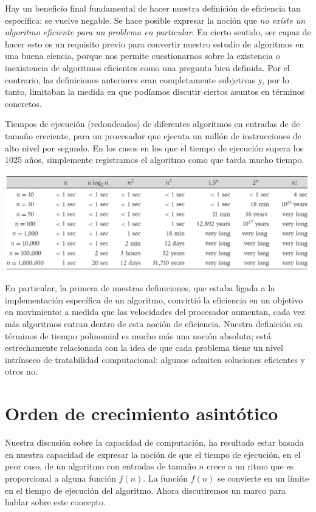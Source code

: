 \documentclass[a4paper, 12pt]{book}
\begin{document}
Hay un beneficio final fundamental de hacer nuestra definición de eficiencia tan específica: se vuelve negable. Se hace posible expresar la noción que \textit{no existe un algoritmo eficiente para un problema en particular}. En cierto sentido, ser capaz de hacer esto es un requisito previo para convertir nuestro estudio de algoritmos en una buena ciencia, porque nos permite cuestionarnos sobre la existencia o inexistencia de algoritmos eficientes como una pregunta bien definida. Por el contrario, las definiciones anteriores eran completamente subjetivas y, por lo tanto, limitaban la medida en que podíamos discutir ciertos asuntos en términos concretos.

\begin{table}[h]
    \centering
    \caption{Tiempos de ejecución (redondeados) de diferentes algoritmos en entradas de
de tamaño creciente, para un procesador que ejecuta un millón de instrucciones de alto nivel por segundo.
En los casos en los que el tiempo de ejecución supera los 1025 años, simplemente registramos el algoritmo como que tarda mucho tiempo.}
\includegraphics[width=1\textwidth]{Imagenes-Seccion1/Figura1.PNG}
\label{tab:tabla2_1}
\end{table}

En particular, la primera de nuestras definiciones, que estaba ligada a la implementación específica de un algoritmo, convirtió la eficiencia en un objetivo en movimiento: a medida que las velocidades del procesador aumentan, cada vez más algoritmos entran dentro de esta noción de eficiencia. Nuestra definición en términos de tiempo polinomial es mucho más una noción absoluta; está estrechamente relacionada con la idea de que cada problema tiene un nivel intrínseco de tratabilidad computacional: algunos admiten soluciones eficientes y otros no.

\section{Orden de crecimiento asintótico}

Nuestra discusión sobre la capacidad de computación, ha resultado estar basada en nuestra capacidad de expresar la noción de que el tiempo de ejecución, en el peor caso, de un algoritmo con entradas de tamaño $n$ crece a un ritmo que es proporcional a alguna función $f(n)$. La función $f(n)$ se convierte en un límite en el tiempo de ejecución del algoritmo. Ahora discutiremos un marco para hablar sobre este concepto.
\end{document}
